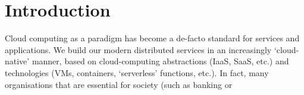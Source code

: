 \section{Introduction}
Cloud computing as a paradigm has become a de-facto standard for services and applications.
We build our modern distributed services in an increasingly `cloud-native' manner, based on cloud-computing abstractions (IaaS, SaaS, etc.) and technologies (VMs, containers, `serverless' functions, etc.).
In fact, many organisations that are essential for society (such as banking or

